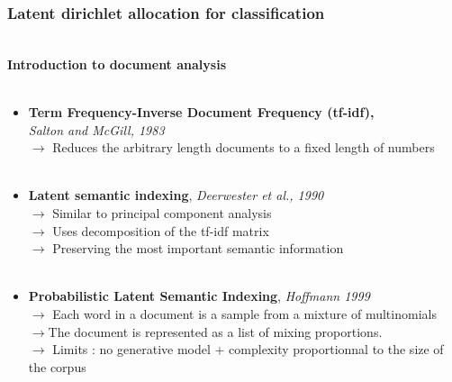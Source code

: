 \documentclass{beamer}
\begin{document}
\begin{frame}

\frametitle{Latent dirichlet allocation for classification}
~\\
\textbf{\large{Introduction to document analysis}}~\\
~\\
\begin{itemize}
\item \textbf{Term Frequency-Inverse Document Frequency (tf-idf),}~\\ \textit{Salton and McGill, 1983}~\\
$\rightarrow$ Reduces the arbitrary length documents to a fixed length of numbers~\\
~\\
\item \textbf{Latent semantic indexing}, \textit{Deerwester et al., 1990}~\\
$\rightarrow$ Similar to principal component analysis~\\
$\rightarrow$ Uses decomposition of the tf-idf matrix~\\
$ \rightarrow$ Preserving the most important semantic information~\\
~\\
\item \textbf{Probabilistic Latent Semantic Indexing}, \textit{Hoffmann 1999}~\\
$\rightarrow$ Each word in a document is a sample from a mixture of multinomials~\\
$\rightarrow$The document is represented as a list of mixing proportions.~\\
$\rightarrow$ Limits : no generative model + complexity proportionnal to the size of the corpus
\end{itemize}

\end{frame}
\end{document}
